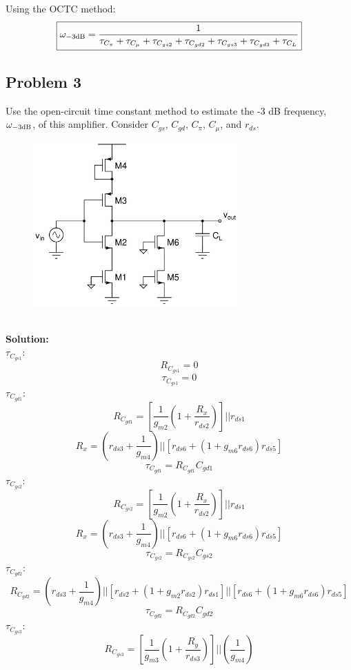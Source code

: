 \documentclass{article}
\begin{document}
Using the OCTC method:
$$\boxed{\omega_{\rm -3dB} = \frac{1}{\tau_{C_{\pi}} + \tau_{C_{\mu}} + \tau_{C_{gs2}} + \tau_{C_{gd2}} + \tau_{C_{gs3}} + \tau_{C_{gd3}} + \tau_{C_L}}}$$
\newpage
\subsection*{Problem 3}
Use the open-circuit time constant method to estimate the -3 dB frequency, $\omega_{\rm -3 dB}$, of this amplifier.  Consider $C_{gs}$, $C_{gd}$, $C_{\pi}$, $C_{\mu}$, and $r_{ds}$. 
\begin{figure}[!h]
\begin{center}
    \includegraphics[width=0.7\textwidth]{figures/cc_octc3 (2).jpg}

\end{center}
\end{figure} \\
\textbf{Solution:} \\
$\tau_{C_{gs1}}$:
$$R_{C_{gs1}} = 0$$
$$\boxed{\tau_{C_{gs1}} = 0}$$
$\tau_{C_{gd1}}$:
$$R_{C_{gd1}} = \left[\frac{1}{g_{m2}}\left(1 + \frac{R_x}{r_{ds2}}\right)\right]||r_{ds1}$$
$$R_x = \left(r_{ds3} + \frac{1}{g_{m4}}\right) || \left[r_{ds6} + (1 + g_{m6}r_{ds6})r_{ds5}\right]$$
$$\boxed{\tau_{C_{gd1}} = R_{C_{gd1}}C_{gd1}}$$
$\tau_{C_{gs2}}$:
$$R_{C_{gs2}} = \left[\frac{1}{g_{m2}}\left(1 + \frac{R_x}{r_{ds2}}\right)\right]||r_{ds1}$$
$$R_x = \left(r_{ds3} + \frac{1}{g_{m4}}\right) || \left[r_{ds6} + (1 + g_{m6}r_{ds6})r_{ds5}\right]$$
$$\boxed{\tau_{C_{gs2}} = R_{C_{gs2}}C_{gs2}}$$
$\tau_{C_{gd2}}$:
$$R_{C_{gd2}} =  \left(r_{ds3} + \frac{1}{g_{m4}}\right) || \left[r_{ds2} + (1 + g_{m2}r_{ds2})r_{ds1}\right] || \left[r_{ds6} + (1 + g_{m6}r_{ds6})r_{ds5}\right]$$
$$\boxed{\tau_{C_{gd2}} = R_{C_{gd2}}C_{gd2}}$$
$\tau_{C_{gs3}}$:
$$R_{C_{gs3}} = \left[\frac{1}{g_{m3}}\left(1 + \frac{R_y}{r_{ds3}}\right)\right]||\left(\frac{1}{g_{m4}}\right)$$
\end{document}
